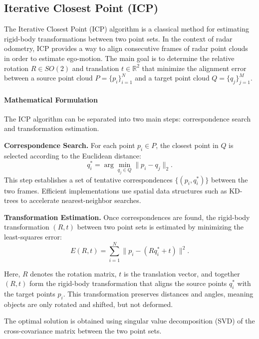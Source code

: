 \subsection{Iterative Closest Point (ICP)}
\label{subsec:icp}

The Iterative Closest Point (ICP) algorithm is a classical method for estimating rigid-body transformations between two point sets. 
In the context of radar odometry, ICP provides a way to align consecutive frames of radar point clouds in order to estimate ego-motion. 
The main goal is to determine the relative rotation $R \in SO(2)$ and translation $t \in \mathbb{R}^2$ that minimize the alignment error between a source point cloud $P = \{p_i\}_{i=1}^N$ and a target point cloud $Q = \{q_j\}_{j=1}^M$.

\paragraph{Mathematical Formulation}
The ICP algorithm can be separated into two main steps: correspondence search and transformation estimation.

\textbf{Correspondence Search.}
For each point $p_i \in P$, the closest point in $Q$ is selected according to the Euclidean distance:
\begin{equation}
    q^*_i = \arg \min_{q_j \in Q} \lVert p_i - q_j \rVert_2.
\end{equation}
This step establishes a set of tentative correspondences $\{(p_i, q^*_i)\}$ between the two frames. 
Efficient implementations use spatial data structures such as KD-trees to accelerate nearest-neighbor searches.

\textbf{Transformation Estimation.}
Once correspondences are found, the rigid-body transformation $(R,t)$ between two point sets is estimated by minimizing the least-squares error:
\begin{equation}
    E(R,t) = \sum_{i=1}^{N} \lVert p_i - (R q^*_i + t) \rVert^2.
\end{equation}

Here, $R$ denotes the rotation matrix, $t$ is the translation vector, and together $(R,t)$ form the rigid-body transformation that aligns the source points $q^*_i$ with the target points $p_i$.  
This transformation preserves distances and angles, meaning objects are only rotated and shifted, but not deformed.  

The optimal solution is obtained using singular value decomposition (SVD) of the cross-covariance matrix between the two point sets.  

